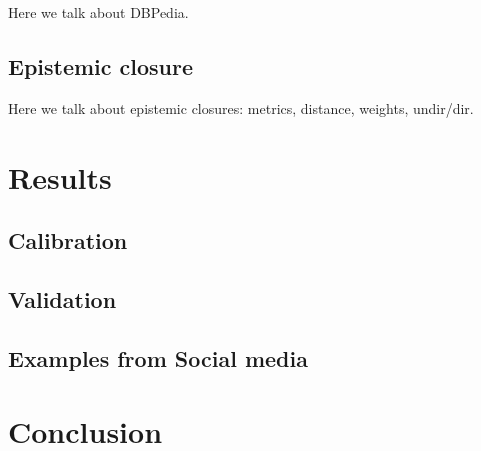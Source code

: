 \documentclass{article}
\begin{document}
Here we talk about DBPedia.

\subsection{Epistemic closure}

Here we talk about epistemic closures: metrics, distance, weights, undir/dir.

\section{Results}

\subsection{Calibration}

\subsection{Validation}

\subsection{Examples from Social media}

\section{Conclusion}



\end{document}
